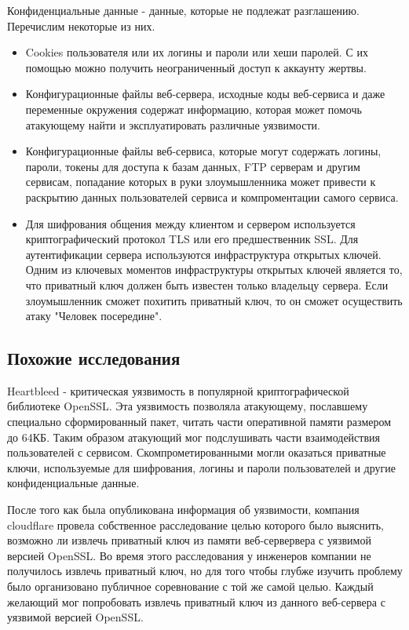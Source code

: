\documentclass[20pt]{article}
\begin{document}
Конфиденциальные данные - данные, которые не подлежат разглашению. Перечислим
некоторые из них.

\begin{itemize}

  \item Cookies пользователя или их логины и пароли или хеши паролей. С их
  помощью можно получить неограниченный доступ к аккаунту жертвы.

  \item Конфигурационные файлы веб-сервера, исходные коды веб-сервиса и даже переменные
  окружения содержат информацию, которая может помочь атакующему найти и
  эксплуатировать различные уязвимости.

  \item Конфигурационные файлы веб-сервиса, которые могут содержать логины,
  пароли, токены для доступа к базам данных, FTP серверам и другим сервисам,
  попадание которых в руки злоумышленника может привести к раскрытию данных
  пользователей сервиса и компроментации самого сервиса.

  \item Для шифрования общения между клиентом и сервером используется криптографический
  протокол TLS\cite{tls} или его предшественник SSL. Для аутентификации сервера
  используются инфраструктура открытых ключей\cite{pki}. Одним из ключевых моментов
  инфраструктуры открытых ключей является то, что приватный ключ должен быть
  известен только владельцу сервера. Если злоумышленник сможет похитить приватный
  ключ, то он сможет осуществить атаку "Человек посередине"\cite{mitm}.

\end{itemize}


\subsection{Похожие исследования}

Heartbleed\cite{heartbleed} - критическая уязвимость в популярной криптографической
библиотеке OpenSSL. Эта уязвимость позволяла атакующему, пославшему специально
сформированный пакет, читать части оперативной памяти размером до 64КБ. Таким
образом атакующий мог подслушивать части взаимодействия пользователей с сервисом.
Скомпрометированными могли оказаться приватные ключи, используемые для шифрования,
логины и пароли пользователей и другие конфиденциальные данные.

После того как была опубликована информация об уязвимости, компания cloudflare
провела собственное расследование\cite{heartbleed/investigation} целью которого
было выяснить, возможно ли извлечь приватный ключ из памяти веб-сервервера с
уязвимой версией OpenSSL. Во время этого расследования у инженеров компании не
получилось извлечь приватный ключ, но для того чтобы глубже изучить проблему
было организовано публичное соревнование\cite{heartbleed/investigation} с той же
самой целью. Каждый желающий мог попробовать извлечь приватный ключ из
данного веб-сервера с уязвимой версией OpenSSL.
\end{document}
